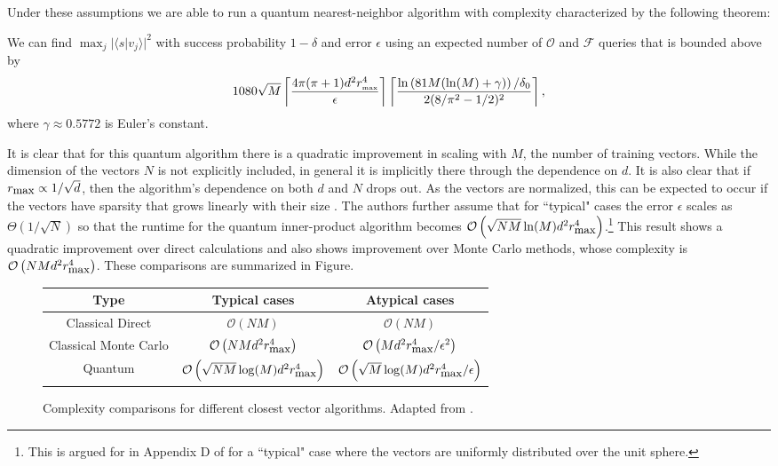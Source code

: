 Under these assumptions we are able to run a quantum nearest-neighbor algorithm with complexity characterized by the following theorem:

\begin{theorem}
We can find $\max_j|\langle s|v_j\rangle|^2$ with success probability $1-\delta$ and error $\epsilon$ using an expected number of $\mathcal{O}$ and $\mathcal{F}$ queries that is bounded above by
\begin{equation}
1080\sqrt{M}\left\lceil\frac{4\pi(\pi+1)d^2r^4_{\tiny\mbox{max}}}{\epsilon}\right\rceil\left\lceil \frac{\ln\left(81M(\ln(M)+\gamma)\right)/\delta_0}{2(8/\pi^2-1/2)^2}\right\rceil,
\end{equation}
where $\gamma\approx 0.5772$ is Euler's constant.
\end{theorem}

It is clear that for this quantum algorithm there is a quadratic improvement in scaling with $M$, the number of training vectors. While the dimension of the vectors $N$ is not explicitly included, in general it is implicitly there through the dependence on $d$.  It is also clear that if $r_{\small\mbox{max}}\propto 1/\sqrt{d}$, then the algorithm's dependence on both $d$ and $N$ drops out. As the vectors are normalized, this can be expected to occur if the vectors have sparsity that grows linearly with their size \cite{wiebe2014quantum}. The authors further assume that for ``typical" cases the error $\epsilon$ scales as $\Theta(1/\sqrt{N})$ so that the runtime for the quantum inner-product algorithm becomes $\mathcal{O}\left(\sqrt{NM}\ln(M)d^2r^4_{\small\mbox{max}}\right)$.\footnote{
This is argued for in Appendix D of \cite{wiebe2014quantum} for a ``typical" case where the vectors are uniformly distributed over the unit sphere.} This result shows a quadratic improvement over direct calculations and also shows improvement over Monte Carlo methods, whose complexity is $\mathcal{O}\left(NMd^2r^4_{\small\mbox{max}}\right)$. These comparisons are summarized in Figure.

\begin{figure}[ht]
\label{fig:comp}
\begin{center}
\begin{tabular}{|c|c|c|}\hline
 Type & Typical cases & Atypical cases   \\ \hline
 Classical Direct & $\mathcal{O}(NM)$ & $\mathcal{O}(NM)$ \\
 Classical Monte Carlo & $\mathcal{O}\left(NMd^2r_{\small\mbox{max}}^4\right)$ & $\mathcal{O}\left(Md^2r_{\small\mbox{max}}^4/\epsilon^2\right)$ \\
 Quantum & $\mathcal{O}\left(\sqrt{NM}\log(M)d^2r^4_{\small\mbox{max}}\right)$ &  $\mathcal{O}\left(\sqrt{M}\log(M)d^2r^4_{\small\mbox{max}}/\epsilon\right)$ \\\hline
\end{tabular}
\end{center}
\caption{Complexity comparisons for different closest vector algorithms. Adapted from \cite{wiebe2014quantum}.}
\end{figure}

